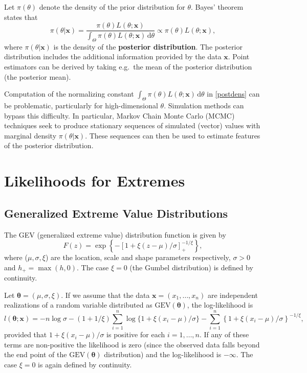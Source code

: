 \documentclass[11pt,a4paper]{article}
\newcommand{\bs}{\boldsymbol}
\begin{document}
Let $\pi(\theta)$ denote the density of the prior distribution for $\theta$.
Bayes' theorem states that
\begin{equation}
\pi(\theta|\bs{x}) = \frac{\pi(\theta)L(\theta;\bs{x})}{\int_{\Theta} \pi(\theta)L(\theta;\bs{x}) \, \text{d}\theta} \propto \pi(\theta)L(\theta;\bs{x}),
\label{postdens}
\end{equation} 
where $\pi(\theta|\bs{x})$ is the density of the \textbf{posterior distribution}.
The posterior distribution includes the additional information provided by the data $\bs{x}$.
Point estimators can be derived by taking e.g.\ the mean of the posterior distribution (the posterior mean).

Computation of the normalizing constant $\int_{\Theta} \pi(\theta)L(\theta;\bs{x}) \, \text{d}\theta$ in \eqref{postdens} can be problematic, particularly for high-dimensional $\theta$.
Simulation methods can bypass this difficulty.
In particular, Markov Chain Monte Carlo (MCMC) techniques seek to produce stationary sequences of simulated (vector) values with marginal density $\pi(\theta|\bs{x})$.
These sequences can then be used to estimate features of the posterior distribution. 

\section{Likelihoods for Extremes}
\setcounter{footnote}{0}
\label{lh}

\subsection{Generalized Extreme Value Distributions}
\label{lhgev}

The GEV (generalized extreme value) distribution function is given by
\begin{equation}
F(z) = \exp \left\{ - \left[ 1+ \xi \left( z-\mu \right) /\sigma  \right]_{+}^{-1/\xi} \right\},
\label{gev}
\end{equation}   
where ($\mu,\sigma,\xi$) are the location, scale and shape parameters respectively, $\sigma > 0$ and $h_{+}=\max(h,0)$.
The case $\xi=0$ (the Gumbel distribution) is defined by continuity.

Let $\bs{\theta} = (\mu,\sigma,\xi)$.
If we assume that the data $\bs{x} = (x_1,\dots,x_n)$ are independent realizations of a random variable distributed as $\text{GEV}(\bs{\theta})$, the log-likelihood is
\begin{equation}
l(\bs{\theta};\bs{x}) = -n\log \sigma - (1 + 1/\xi) \sum_{i=1}^n \log\{1+ \xi \left( x_i-\mu \right) /\sigma\} - \sum_{i=1}^n  \left\{ 1 + \xi \left( x_i-\mu \right) /\sigma  \right\}^{-1/\xi},
\label{gevlik}
\end{equation}
provided that $1 + \xi \left( x_i-\mu \right) /\sigma$ is positive for each $i=1,\dots,n$. 
If any of these terms are non-positive the likelihood is zero (since the observed data falls beyond the end point of the $\text{GEV}(\bs{\theta})$ distribution) and the log-likelihood is $-\infty$.
The case $\xi=0$ is again defined by continuity.
  
\end{document}
